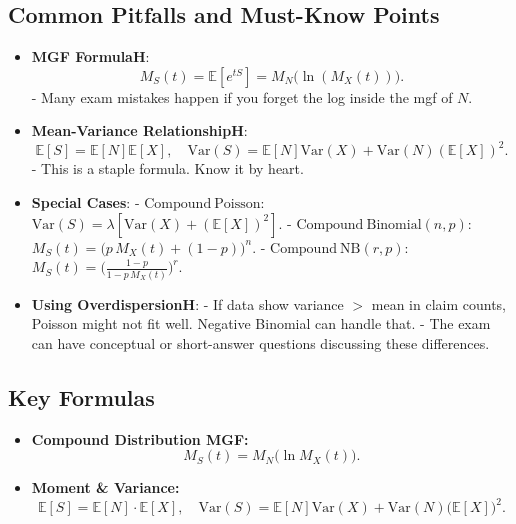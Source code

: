 \documentclass[13pt,a4paper]{article}
\begin{document}
\subsection{Common Pitfalls and Must-Know Points}
\begin{itemize}
  \item \textbf{MGF FormulaH}:
    \[
      M_S(t) = \mathbb{E}[e^{tS}] = M_N\bigl(\ln(M_X(t))\bigr).
    \]
    - Many exam mistakes happen if you forget the log inside the mgf of \(N\).
  \item \textbf{Mean-Variance RelationshipH}:
    \[
      \mathbb{E}[S]=\mathbb{E}[N]\mathbb{E}[X], 
      \quad 
      \mathrm{Var}(S)=\mathbb{E}[N]\mathrm{Var}(X)+\mathrm{Var}(N)(\mathbb{E}[X])^2.
    \]
    - This is a staple formula. Know it by heart. 
  \item \textbf{Special Cases}:
    - \(\mathrm{Compound\ Poisson}\): \(\mathrm{Var}(S)=\lambda[\mathrm{Var}(X)+(\mathbb{E}[X])^2]\).
    - \(\mathrm{Compound\ Binomial}(n,p)\): \(M_S(t)=\bigl(p\,M_X(t)+(1-p)\bigr)^n\).
    - \(\mathrm{Compound\ NB}(r,p)\): \(M_S(t)=\bigl(\frac{1-p}{1-p\,M_X(t)}\bigr)^r\).
  \item \textbf{Using OverdispersionH}:
    - If data show variance $>$ mean in claim counts, Poisson might not fit well. Negative Binomial can handle that.  
    - The exam can have conceptual or short-answer questions discussing these differences.
\end{itemize}

\subsection{Key Formulas}
\begin{itemize}
  \item \textbf{Compound Distribution MGF:}
    \[
      M_S(t) = M_N\bigl(\ln M_X(t)\bigr).
    \]
  \item \textbf{Moment \& Variance:}
    \[
      \mathbb{E}[S] = \mathbb{E}[N]\cdot \mathbb{E}[X],\quad 
      \mathrm{Var}(S)=\mathbb{E}[N]\mathrm{Var}(X)+\mathrm{Var}(N)\bigl(\mathbb{E}[X]\bigr)^2.
    \]
\end{itemize}
\end{document}
